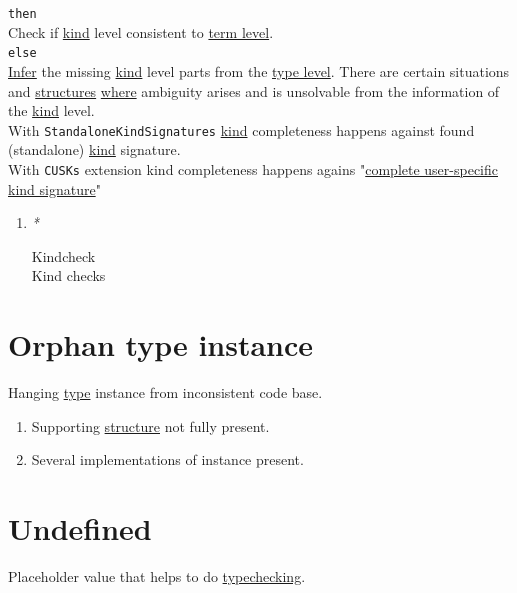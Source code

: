\documentclass[a4paper,14pt,oneside]{book}
\begin{document}
\texttt{then}\\

Check if \hyperref[org67644b6]{kind} level consistent to \hyperref[org12f28ff]{term level}.\\

\texttt{else}\\

\hyperref[org5cd62af]{Infer} the missing \hyperref[org67644b6]{kind} level parts from the \hyperref[orgc61a8a3]{type level}. There are certain situations and \hyperref[orgcf18e73]{structures} \hyperref[org1a56575]{where} ambiguity arises and is unsolvable from the information of the \hyperref[org67644b6]{kind} level.\\

With \texttt{StandaloneKindSignatures} \hyperref[org67644b6]{kind} completeness happens against found (standalone) \hyperref[org67644b6]{kind} signature.\\

With \texttt{CUSKs} extension \label{orgff6afaa}kind completeness happens agains "\hyperref[orgf26af63]{complete user-specific kind signature}"\\

\begin{enumerate}
\item \emph{*}
\label{sec:orgee1b7c8}

\label{orgac30c22}Kindcheck\\
\label{orgb37d878}Kind checks\\
\end{enumerate}

\section{\label{org713fcd8}Orphan type instance}
\label{sec:org39d8b24}
Hanging \hyperref[orgc4a7610]{type} instance from inconsistent code base.\\
\begin{enumerate}
\item Supporting \hyperref[orgc6baf3c]{structure} not fully present.\\
\item Several implementations of instance present.\\
\end{enumerate}

\section{\label{org3c7f3d6}Undefined}
\label{sec:orga664a80}
Placeholder value that helps to do \hyperref[org765e3bc]{typechecking}.\\
\end{document}
